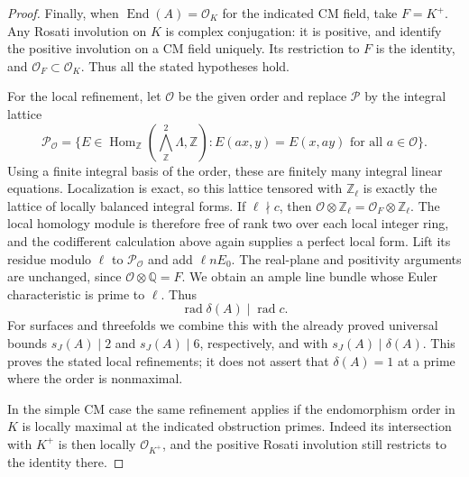 \begin{proof}
Finally, when \(\operatorname{End}(A)=\mathcal O_K\) for
the indicated CM field, take \(F=K^+\).
Any Rosati involution on \(K\) is complex conjugation:
it is positive, and
\citet[Proposition 1.39 and Corollary 1.40,
pp.~20--21]{frC4MilneCM2020RM}
identify the positive involution on a CM field uniquely.
Its restriction to \(F\) is the identity, and
\(\mathcal O_F\subset\mathcal O_K\). Thus all the stated
hypotheses hold.

For the local refinement, let \(\mathcal O\) be the given
order and replace \(\mathcal P\) by the integral lattice
\[
 \mathcal P_{\mathcal O}=
 \{E\in\operatorname{Hom}_{\mathbb Z}
       (\textstyle\bigwedge^2_{\mathbb Z}\Lambda,\mathbb Z):
             E(ax,y)=E(x,ay)\text{ for all }a\in\mathcal O\}.
\]
Using a finite integral basis of the order, these are
finitely many integral linear equations. Localization
is exact, so this lattice tensored with \(\mathbb Z_\ell\)
is exactly the lattice of locally balanced integral
forms. If \(\ell\nmid c\), then
\(\mathcal O\otimes\mathbb Z_\ell=
\mathcal O_F\otimes\mathbb Z_\ell\). The local homology
module is therefore free of rank two over each local
integer ring, and the codifferent calculation above
again supplies a perfect local form.
Lift its residue modulo \(\ell\) to
\(\mathcal P_{\mathcal O}\) and add \(\ell nE_0\).
The real-plane and positivity arguments are unchanged,
since \(\mathcal O\otimes\mathbb Q=F\).
We obtain an ample line bundle whose Euler
characteristic is prime to \(\ell\). Thus
\[
            \operatorname{rad}\delta(A)
                   \mid\operatorname{rad}c.
\]
For surfaces and threefolds we combine this with the
already proved universal bounds \(s_J(A)\mid2\) and
\(s_J(A)\mid6\), respectively, and with
\(s_J(A)\mid\delta(A)\). This proves the stated
local refinements; it does not assert that
\(\delta(A)=1\) at a prime where the order is nonmaximal.

In the simple CM case the same refinement applies if
the endomorphism order in \(K\) is locally maximal at
the indicated obstruction primes. Indeed its
intersection with \(K^+\) is then locally
\(\mathcal O_{K^+}\), and the positive Rosati
involution still restricts to the identity there.
\end{proof}

